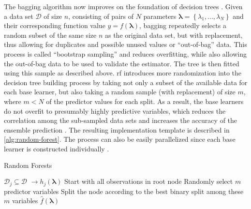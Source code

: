 The bagging algorithm now improves on the foundation of decision trees \cite{breiman1996bagging}. Given a data set $\mathcal{D}$ of size $n$, consisting of pairs of $N$ parameters $\mathbf{\lambda} = \left\lbrace \lambda_1,...,\lambda_N\right\rbrace $ and their corresponding function value $y = f(\mathbf{\lambda})$, bagging repeatedly selects a random subset of the same size $n$ as the original data set, but with replacement, thus allowing for duplicates and possible unused values or \enquote{out-of-bag} data. This process is called \enquote{bootstrap sampling} and reduces overfitting, while also allowing the out-of-bag data to be used to validate the estimator. The tree is then fitted using this sample as described above.
\gls{rf} introduces more randomization into the decision tree building process by taking not only a subset of the available data for each base learner, but also taking a random sample (with replacement) of size $m$, where $m < N$ of the predictor values for each split. As a result, the base learners do not overfit to presumably highly predictive variables, which reduces the correlation among the sub-sampled data sets and increases the accuracy of the ensemble prediction \cite{ho2002data}. The resulting implementation template is described in \cref{alg:random-forest}. The process can also be easily parallelized since each base learner is constructed individually \cite{cutler2012random}.

\begin{algorithm}
	\caption{Random Forests}
	\label{alg:random-forest}
	\begin{algorithmic}
			\State $\mathcal{D}_j \subseteq \mathcal{D}$ 
			 $ \to h_j(\mathbf{\lambda})$
				\State Start with all observations in root node
					\State Randomly select $m$ predictor variables
					\State Split the node according to the best binary split among these $m$ variables
				\EndFor
			\EndProcedure
		\EndFor
		\Return $\hat{f}(\mathbf{\lambda})$ 
	\end{algorithmic}
\end{algorithm}


